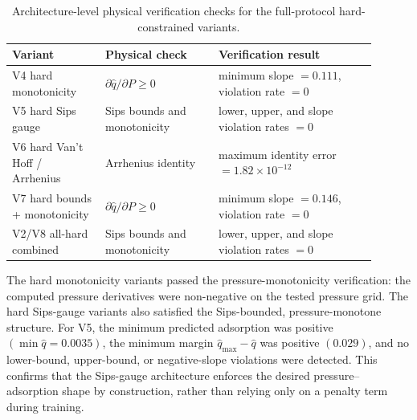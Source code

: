\documentclass[11pt]{article}
\begin{document}
\begin{table}[htbp]
    \centering
    \begin{tabular}{@{}>{\raggedright\arraybackslash}p{0.23\linewidth}
        >{\raggedright\arraybackslash}p{0.28\linewidth}
        >{\raggedright\arraybackslash}p{0.39\linewidth}@{}}
        \toprule
        \textbf{Variant} & \textbf{Physical check}                         & \textbf{Verification result} \\
        \midrule
        V4 hard monotonicity
                         & \(\partial \hat{q}/\partial P \geq 0\)
                         & minimum slope \(=0.111\), violation rate \(=0\)                                \\
        V5 hard Sips gauge
                         & Sips bounds and monotonicity
                         & lower, upper, and slope violation rates \(=0\)                                 \\
        V6 hard Van't Hoff / Arrhenius
                         & Arrhenius identity
                         & maximum identity error \(=1.82\times10^{-12}\)                                 \\
        V7 hard bounds + monotonicity
                         & \(\partial \hat{q}/\partial P \geq 0\)
                         & minimum slope \(=0.146\), violation rate \(=0\)                                \\
        V2/V8 all-hard combined
                         & Sips bounds and monotonicity
                         & lower, upper, and slope violation rates \(=0\)                                 \\
        \bottomrule
    \end{tabular}
    \caption{Architecture-level physical verification checks for the
        full-protocol hard-constrained variants.}
    \label{tab:physical-verification}
\end{table}

The hard monotonicity variants passed the pressure-monotonicity verification:
the computed pressure derivatives were non-negative on the tested pressure
grid. The hard Sips-gauge variants also satisfied the Sips-bounded,
pressure-monotone structure.
For V5, the minimum predicted adsorption was positive
\((\min\hat{q}=0.0035)\), the minimum margin
\(\hat{q}_{\max}-\hat{q}\) was positive \((0.029)\), and no lower-bound,
upper-bound, or negative-slope violations were detected. This confirms that the
Sips-gauge architecture enforces the desired pressure--adsorption shape by
construction, rather than relying only on a penalty term during training.
\end{document}

